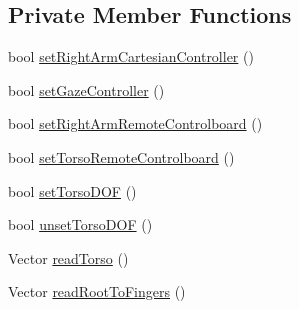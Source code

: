\subsection*{Private Member Functions}
\begin{DoxyCompactItemize}
\item 
bool \hyperlink{classRFMReaching_a68ed451f26410a3b339d20e94cdcd3a8}{set\+Right\+Arm\+Cartesian\+Controller} ()
\item 
bool \hyperlink{classRFMReaching_a63c0db54da18c8357acfb9d55f0e7fad}{set\+Gaze\+Controller} ()
\item 
bool \hyperlink{classRFMReaching_a1898344cb04c1ae423bdaaee644b78d0}{set\+Right\+Arm\+Remote\+Controlboard} ()
\item 
bool \hyperlink{classRFMReaching_ac4f2875b315b0afc49f0e6cc4735f70f}{set\+Torso\+Remote\+Controlboard} ()
\item 
bool \hyperlink{classRFMReaching_af7908ece851513d3df2eaf75f3f45619}{set\+Torso\+D\+OF} ()
\item 
bool \hyperlink{classRFMReaching_a33ac59486a536d9334a6992d16433157}{unset\+Torso\+D\+OF} ()
\item 
Vector \hyperlink{classRFMReaching_a3a2a0c8cfdfe016a0f35cc359629f1d0}{read\+Torso} ()
\item 
Vector \hyperlink{classRFMReaching_a160dd5be2aeca203b1cffcf1ad463de7}{read\+Root\+To\+Fingers} ()
\end{DoxyCompactItemize}
